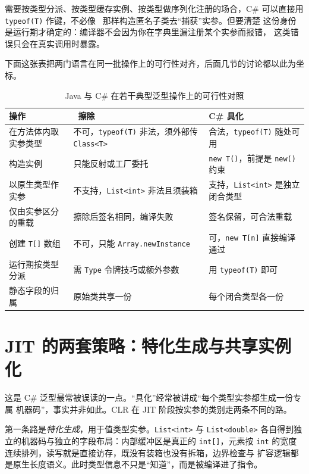 \documentclass[12pt,a4paper,fontset=fandol]{ctexbook}
\newcommand{\javalabel}{%
  \tcbox[on line,colback=javaheadbg,colframe=javaheadbg,
    boxrule=0pt,arc=1pt,left=2pt,right=2pt,top=1pt,bottom=1pt,
    colupper=white,fontupper=\scriptsize\bfseries]{Java}}
\newcommand{\kw}[1]{\texttt{#1}}
\begin{document}
\begin{bestpractice}[title={把 \kw{typeof(T)} 当作可依赖的运行期身份}]
需要按类型分派、按类型缓存实例、按类型做序列化注册的场合，C\# 可以直接用
\kw{typeof(T)} 作键，不必像 \javalabel\ 那样构造匿名子类去“捕获”实参。但要清楚
这份身份是运行期才确定的：编译器不会因为你在字典里漏注册某个实参而报错，
这类错误只会在真实调用时暴露。
\end{bestpractice}

下面这张表把两门语言在同一批操作上的可行性对齐，后面几节的讨论都以此为坐标。

\begin{table}
\centering
\caption{Java 与 C\# 在若干典型泛型操作上的可行性对照}
\begin{tabularx}{0.83\textwidth}{%
  >{\raggedright\arraybackslash}p{}
  >{\raggedright\arraybackslash}X
  >{\raggedright\arraybackslash}X}
\toprule
操作 & \javalabel\ 擦除 & C\# 具化 \\
\midrule
在方法体内取实参类型 & 不可，\kw{typeof(T)} 非法，须外部传 \kw{Class<T>} & 合法，\kw{typeof(T)} 随处可用 \\
构造实例 & 只能反射或工厂委托 & \kw{new T()}，前提是 \kw{new()} 约束 \\
以原生类型作实参 & 不支持，\kw{List<int>} 非法且须装箱 & 支持，\kw{List<int>} 是独立闭合类型 \\
仅由实参区分的重载 & 擦除后签名相同，编译失败 & 签名保留，可合法重载 \\
创建 \kw{T[]} 数组 & 不可，只能 \kw{Array.newInstance} & 可，\kw{new T[n]} 直接编译通过 \\
运行期按类型分派 & 需 \kw{Type} 令牌技巧或额外参数 & 用 \kw{typeof(T)} 即可 \\
静态字段的归属 & 原始类共享一份 & 每个闭合类型各一份 \\
\bottomrule
\end{tabularx}
\end{table}

\section{JIT 的两套策略：特化生成与共享实例化}

这是 C\# 泛型最常被误读的一点。“具化”经常被讲成“每个类型实参都生成一份专属
机器码”，事实并非如此。CLR 在 JIT 阶段按实参的类别走两条不同的路。

第一条路是\emph{特化生成}，用于值类型实参。\kw{List<int>} 与 \kw{List<double>}
各自得到独立的机器码与独立的字段布局：内部缓冲区是真正的 \kw{int[]}，元素按
\kw{int} 的宽度连续排列，读写就是直接访存，既没有装箱也没有拆箱，边界检查与
扩容逻辑都是原生长度语义。此时类型信息不只是“知道”，而是被编译进了指令。
\end{document}
